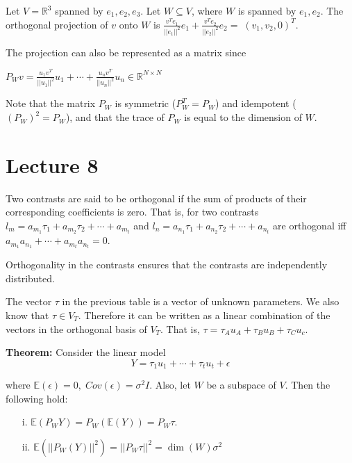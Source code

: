 \documentclass[12pt, oneside]{article}
\begin{document}
Let $V = \mathbb{R}^{3}$ spanned by $e_{1}, e_{2}, e_{3}$. Let $W \subseteq V$, where $W$ is spanned by $e_{1}, e_{2}$.  The orthogonal projection of $v$ onto $W$ is $\frac{v^{T}e_{1}}{||e_{1}||^{2}} e_{1} +  \frac{v^{T}e_{2}}{||e_{2}||^{2}} e_{2} = \; (v_{1}, v_{2}, 0)^{T}$.

The projection can also be represented as a matrix since 

\begin{math}
P_{W}v = \frac{u_{1}v^{T}}{||u_{1}||^{2}}u_{1}  + \cdots + \frac{u_{n}v^{T} }{||u_{n}||^{2}}u_{n}  \in \mathbb{R}^{N \times N}
\end{math}

Note that the matrix $P_{W}$ is symmetric ($P^{T}_{W} = P_{W}$) and idempotent ($(P_{W})^{2} = P_{W}$), and that the trace of $P_{W}$ is equal to the dimension of $W$.


\section{Lecture 8}

Two contrasts are said to be orthogonal if the sum of products of their corresponding coefficients is zero. That is, for two contrasts
$l_{m} = a_{m_{1}}\tau_{1} + a_{m_{2}}\tau_{2} + \cdots + a_{m_{t}}$ and 
$l_{n} = a_{n_{1}}\tau_{1} + a_{n_{2}}\tau_{2} + \cdots + a_{n_{t}}$ are orthogonal iff 
$a_{m_{1}} a_{n_{1}} + \cdots + a_{m_{t}} a_{n_{t}} = 0$.

Orthogonality in the contrasts ensures that the contrasts are independently distributed. 

The vector $\tau$ in the previous table is a vector of unknown parameters. We also know that $\tau \in V_{T}$. 
Therefore it can be written as a linear combination of the vectors in the orthogonal basis of $V_{T}$. That is,
$\tau = \tau_{A} u_{A} + \tau_{B} u_{B} + \tau_{C} u_{c}$.

\textbf{Theorem: } Consider the linear model
\begin{equation}
Y = \tau_{1} u_{1} + \cdots + \tau_{t} u_{t} + \epsilon
\end{equation}

where $\mathbb{E}(\epsilon) = 0, \; Cov(\epsilon) = \sigma^{2}I$. Also, let $W$ be a subspace of $V$. Then the following hold:

\begin{itemize}

  \item[i.] $\mathbb{E} (P_{W} Y) = P_{W} (\mathbb{E}(Y)) = P_{W}\tau$.
  \item[ii. ] $\mathbb{E}(||P_{W} (Y)||^{2}) = ||P_{W} \tau||^{2} = \dim (W) \sigma^{2}$

\end{itemize}
\end{document}
